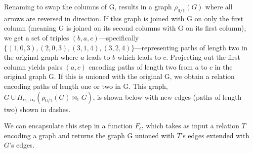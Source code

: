 \begin{center}
\end{center}

Renaming to swap the columns of G, results in a graph $\rho_{0 / 1}(G)$ where all arrows are reversed in direction. If this graph is joined with G on only the first column (meaning G is joined on its second columns with G on its first column), we get a set of triples $(b,a,c)$---specifically $\{(1,0,3),(2,0,3),(3,1,4),(3,2,4)\}$---representing paths of length two in the original graph where $a$ leads to $b$ which leads to $c$. Projecting out the first column yields pairs $(a,c)$ encoding paths of length two from $a$ to $c$ in the original graph G. If this is unioned with the original G, we obtain a relation encoding paths of length one or two in G. This graph, $G \cup \Pi_{\alpha_1,\alpha_2}(\rho_{0 / 1}(G) \bowtie_1 G)$, is shown below with new edges (paths of length two) shown in dashes.

\begin{center}
\end{center}

We can encapsulate this step in a function $F_G$ which takes as input a relation $T$ encoding a graph and returns the graph G unioned with $T$'s edges extended with $G$'s edges.

